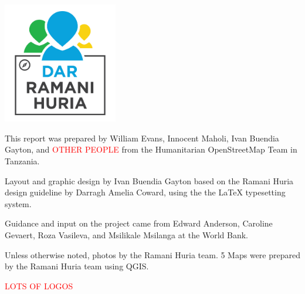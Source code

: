 \documentclass[a4paper,12pt,twoside]{article}
\begin{document}
\newpage
\color{RHgrey}

\begin{center}
{\includegraphics[width=5cm]{Dar_Ramani_Huria_logo.png}}
\end{center}

This report was prepared by William Evans, Innocent Maholi, Ivan Buendia Gayton, and \textcolor{red}{OTHER PEOPLE} from the Humanitarian OpenStreetMap Team in Tanzania.

\medskip

Layout and graphic design by Ivan Buendia Gayton based on the Ramani Huria design guideline by Darragh Amelia Coward, using the the \LaTeX { } typesetting system.

\medskip

Guidance and input on the project came from Edward Anderson, Caroline Gevaert, Roza Vasileva, and Msilikale Msilanga at the World Bank.

\medskip

Unless otherwise noted, photos by the Ramani Huria team.
5
 Maps were prepared by the Ramani Huria team using QGIS.

\bigskip\bigskip

\textcolor{red}{LOTS OF LOGOS}

\newpage

\tableofcontents

\newpage
\end{document}
